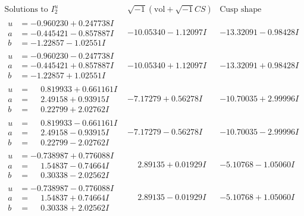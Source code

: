 \documentclass[1p]{elsarticle_modified}
\theoremstyle{definition}
\newcommand{\I}{\sqrt{-1}}
\begin{document}
$$\begin{array}{c|c|c}  
\text{Solutions to }I^u_{2}& \I (\text{vol} + \sqrt{-1}CS) & \text{Cusp shape}\\
 \hline 
\begin{aligned}
u &= -0.960230 + 0.247738 I \\
a &= -0.445421 - 0.857887 I \\
b &= -1.22857 - 1.02551 I\end{aligned}
 & -10.05340 - 1.12097 I & -13.32091 - 0.98428 I \\ \hline\begin{aligned}
u &= -0.960230 - 0.247738 I \\
a &= -0.445421 + 0.857887 I \\
b &= -1.22857 + 1.02551 I\end{aligned}
 & -10.05340 + 1.12097 I & -13.32091 + 0.98428 I \\ \hline\begin{aligned}
u &= \phantom{-}0.819933 + 0.661161 I \\
a &= \phantom{-}2.49158 + 0.93915 I \\
b &= \phantom{-}0.22799 + 2.02762 I\end{aligned}
 & -7.17279 + 0.56278 I & -10.70035 + 2.99996 I \\ \hline\begin{aligned}
u &= \phantom{-}0.819933 - 0.661161 I \\
a &= \phantom{-}2.49158 - 0.93915 I \\
b &= \phantom{-}0.22799 - 2.02762 I\end{aligned}
 & -7.17279 - 0.56278 I & -10.70035 - 2.99996 I \\ \hline\begin{aligned}
u &= -0.738987 + 0.776088 I \\
a &= \phantom{-}1.54837 - 0.74664 I \\
b &= \phantom{-}0.30338 - 2.02562 I\end{aligned}
 & \phantom{-}2.89135 + 0.01929 I & -5.10768 - 1.05060 I \\ \hline\begin{aligned}
u &= -0.738987 - 0.776088 I \\
a &= \phantom{-}1.54837 + 0.74664 I \\
b &= \phantom{-}0.30338 + 2.02562 I\end{aligned}
 & \phantom{-}2.89135 - 0.01929 I & -5.10768 + 1.05060 I \\ \hline\begin{aligned}

\end{aligned}
\end{array}$$
\end{document}
